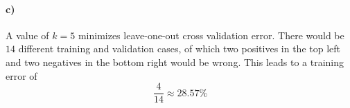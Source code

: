 \documentclass[12pt]{article}
\begin{document}
\paragraph{c)}

A value of \(k=5\) minimizes leave-one-out cross validation error. There would be \(14\) different training and validation cases, of which
two positives in the top left and two negatives in the bottom right would be wrong. This leads to a training error of
\[\frac{4}{14}\approx 28.57\%\]
\end{document}
